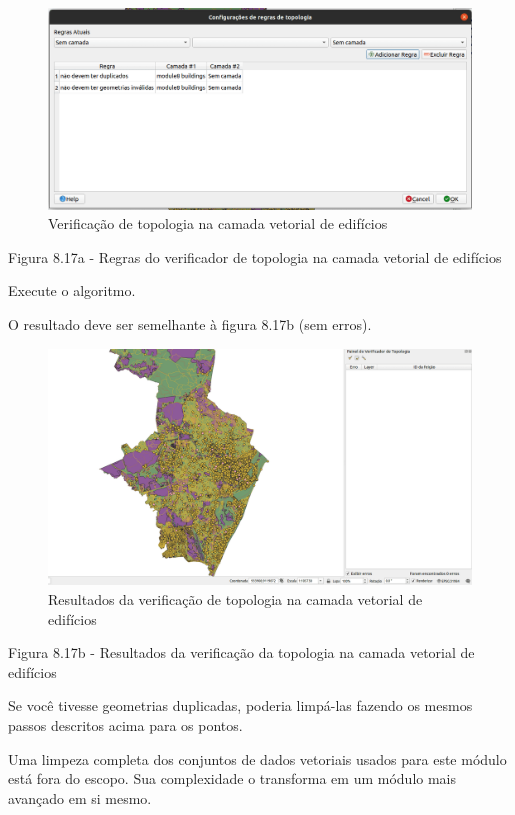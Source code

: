 \documentclass[
]{krantz}
\begin{document}
\begin{figure}
\centering
\includegraphics{media/modulo8/fig817_a.png}
\caption{Verificação de topologia na camada vetorial de edifícios}
\end{figure}

Figura 8.17a - Regras do verificador de topologia na camada vetorial de edifícios

Execute o algoritmo.

O resultado deve ser semelhante à figura 8.17b (sem erros).

\begin{figure}
\centering
\includegraphics{media/modulo8/fig817_b.png}
\caption{Resultados da verificação de topologia na camada vetorial de edifícios}
\end{figure}

Figura 8.17b - Resultados da verificação da topologia na camada vetorial de edifícios

Se você tivesse geometrias duplicadas, poderia limpá-las fazendo os mesmos passos descritos acima para os pontos.

Uma limpeza completa dos conjuntos de dados vetoriais usados \hspace{0pt}\hspace{0pt}para este módulo está fora do escopo. Sua complexidade o transforma em um módulo mais avançado em si mesmo.
\end{document}
